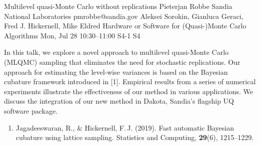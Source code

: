 \documentclass[12pt,lettersize,oneside]{book} %
\begin{document}
\begin{talk}
  {Multilevel quasi-Monte Carlo without replications}%
  {Pieterjan Robbe}%
  {Sandia National Laboratories}%
  {pmrobbe@sandia.gov}%
  {Aleksei Sorokin, Gianluca Geraci, Fred J. Hickernell, Mike Eldred}%
  {Hardware or Software for (Quasi-)Monte Carlo Algorithms}%
  {Mon, Jul 28 10:30--11:00}%
  {S4-1}%
  {S4}%
    
   
In this talk, we explore a novel approach to multilevel quasi-Monte Carlo (MLQMC) sampling that eliminates the need for stochastic replications. Our approach for estimating the level-wise variances is based on the Bayesian cubature framework introduced in [1]. Empirical results from a series of numerical experiments illustrate the effectiveness of our method in various applications. We discuss the integration of our new method in Dakota, Sandia's flagship UQ software package.

\medskip

\begin{enumerate}
  \item[{[1]}] Jagadeeswaran, R., \& Hickernell, F.\,J. (2019). Fast automatic Bayesian cubature using lattice sampling. Statistics and Computing, \textbf{29}(6), 1215--1229.
\end{enumerate}

\end{talk}
\end{document}

